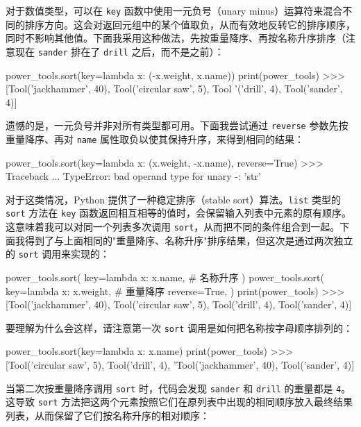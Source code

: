 对于数值类型，可以在 \texttt{key} 函数中使用一元负号（unary minus）运算符来混合不同的排序方向。这会对返回元组中的某个值取负，从而有效地反转它的排序顺序，同时不影响其他值。下面我采用这种做法，先按重量降序、再按名称升序排序（注意现在 \texttt{sander} 排在了 \texttt{drill} 之后，而不是之前）：

\begin{codebox}[python]
power_tools.sort(key=lambda x: (-x.weight, x.name))
print(power_tools)
>>>
[Tool('jackhammer', 40), Tool('circular saw', 5), Tool
'('drill', 4), Tool('sander', 4)]
\end{codebox}

遗憾的是，一元负号并非对所有类型都可用。下面我尝试通过 \texttt{reverse} 参数先按重量降序、再对 \texttt{name} 属性取负以使其保持升序，来得到相同的结果：

\begin{codebox}[python]
power_tools.sort(key=lambda x: (x.weight, -x.name),
reverse=True)
>>>
Traceback ...
TypeError: bad operand type for unary -: 'str'
\end{codebox}

对于这类情况，Python 提供了一种稳定排序（stable sort）算法。\texttt{list} 类型的 \texttt{sort} 方法在 \texttt{key} 函数返回相互相等的值时，会保留输入列表中元素的原有顺序。这意味着我可以对同一个列表多次调用 \texttt{sort}，从而把不同的条件组合到一起。下面我得到了与上面相同的"重量降序、名称升序"排序结果，但这次是通过两次独立的 \texttt{sort} 调用来实现的：

\begin{codebox}[python]
power_tools.sort(
    key=lambda x: x.name,    # 名称升序
)
power_tools.sort(
    key=lambda x: x.weight,  # 重量降序
    reverse=True,
)
print(power_tools)
>>>
[Tool('jackhammer', 40), Tool('circular saw', 5),
Tool('drill', 4), Tool('sander', 4)]
\end{codebox}

要理解为什么会这样，请注意第一次 \texttt{sort} 调用是如何把名称按字母顺序排列的：

\begin{codebox}[python]
power_tools.sort(key=lambda x: x.name)
print(power_tools)
>>>
[Tool('circular saw', 5), Tool('drill', 4),
'Tool('jackhammer', 40), Tool('sander', 4)]
\end{codebox}

当第二次按重量降序调用 \texttt{sort} 时，代码会发现 \texttt{sander} 和 \texttt{drill} 的重量都是 \texttt{4}。这导致 \texttt{sort} 方法把这两个元素按照它们在原列表中出现的相同顺序放入最终结果列表，从而保留了它们按名称升序的相对顺序：

